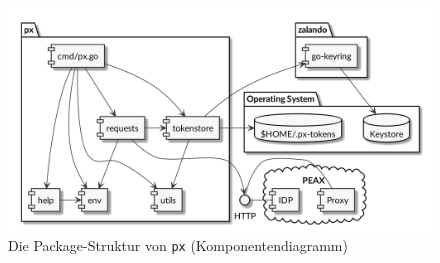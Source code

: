 \begin{figure}
    \centering
    \includegraphics[width=\linewidth]{pics/komponentendiagramm.png}
    \caption{Die Package-Struktur von \texttt{px} (Komponentendiagramm)}
    \label{img:Komponentendiagramm}
\end{figure}


